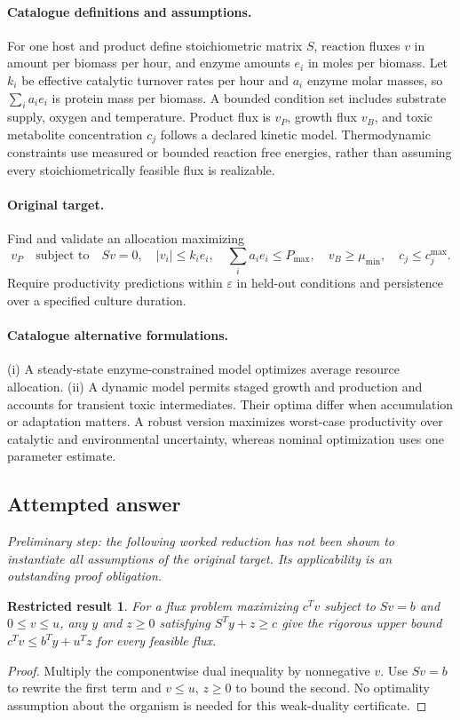 \documentclass[11pt]{article}
\newtheorem{attemptresult}{Restricted result}[section]
\begin{document}
\paragraph{Catalogue definitions and assumptions.}
For one host and product define stoichiometric matrix $S$, reaction fluxes $v$ in amount per biomass per hour, and enzyme amounts $e_i$ in moles per biomass. Let $k_i$ be effective catalytic turnover rates per hour and $a_i$ enzyme molar masses, so $\sum_i a_i e_i$ is protein mass per biomass. A bounded condition set includes substrate supply, oxygen and temperature. Product flux is $v_P$, growth flux $v_B$, and toxic metabolite concentration $c_j$ follows a declared kinetic model. Thermodynamic constraints use measured or bounded reaction free energies, rather than assuming every stoichiometrically feasible flux is realizable.
\paragraph{Original target.}
Find and validate an allocation maximizing
\[
 v_P\quad\text{subject to}\quad Sv=0,\quad
 |v_i|\leq k_ie_i,\quad\sum_i a_ie_i\leq P_{\max},
 \quad v_B\geq\mu_{\min},\quad c_j\leq c_j^{\max}.
\]
Require productivity predictions within $\varepsilon$ in held-out conditions and persistence over a specified culture duration.
\paragraph{Catalogue alternative formulations.}
(i) A steady-state enzyme-constrained model optimizes average resource allocation. (ii) A dynamic model permits staged growth and production and accounts for transient toxic intermediates. Their optima differ when accumulation or adaptation matters. A robust version maximizes worst-case productivity over catalytic and environmental uncertainty, whereas nominal optimization uses one parameter estimate.
\subsection{Attempted answer}
\noindent\emph{Preliminary step: the following worked reduction has not been shown to instantiate all assumptions of the original target. Its applicability is an outstanding proof obligation.}

\begin{attemptresult}
For a flux problem maximizing $c^Tv$ subject to $Sv=b$ and $0\leq v\leq u$, any $y$ and $z\geq0$ satisfying $S^Ty+z\geq c$ give the rigorous upper bound $c^Tv\leq b^Ty+u^Tz$ for every feasible flux.
\end{attemptresult}
\begin{proof}
Multiply the componentwise dual inequality by nonnegative $v$. Use $Sv=b$ to rewrite the first term and $v\leq u$, $z\geq0$ to bound the second. No optimality assumption about the organism is needed for this weak-duality certificate.
\end{proof}
\end{document}
